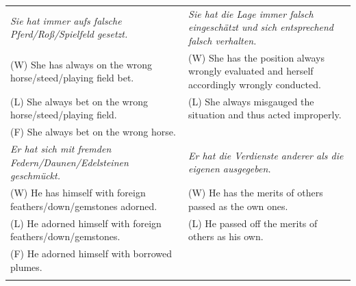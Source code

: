 \documentclass[output=paper]{langsci/langscibook}
\begin{document}
\begin{table}
\begin{tabularx}{\textwidth}{QQ}
\textit{Sie hat immer aufs falsche Pferd/Roß/Spielfeld gesetzt.}       & \textit{Sie hat die Lage immer falsch eingeschätzt und sich entsprechend falsch verhalten.}  \\
\hspace{3mm}(W) She has always on the wrong horse/steed/playing field bet.         & \hspace{3mm}(W) She has the position always wrongly evaluated and herself accordingly wrongly conducted. \\
\hspace{3mm}(L) She always bet on the wrong horse/steed/playing field.             & \hspace{3mm}(L) She always misgauged the situation and thus acted improperly.                            \\
\hspace{3mm}(F) She always bet on the wrong horse.                                 &                                                                                              \\ \tablevspace
\textit{Er hat sich mit fremden Federn/Daunen/Edelsteinen geschmückt.} & \textit{Er hat die Verdienste anderer als die eigenen ausgegeben.}                           \\
\hspace{3mm}(W) He has himself with foreign feathers/down/gemstones adorned.       & \hspace{3mm}(W) He has the merits of others passed as the own ones.                                      \\
\hspace{3mm}(L) He adorned himself with foreign feathers/down/gemstones.           & \hspace{3mm}(L) He passed off the merits of others as his own.                                           \\
\hspace{3mm}(F) He adorned himself with borrowed plumes.                           &                                                                                              \\ \lspbottomrule
\end{tabularx}
\end{table}
\end{document}
